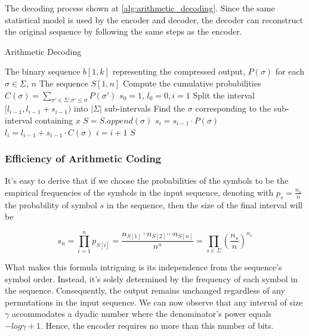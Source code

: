 \noindent The decoding process shown at \ref{alg:arithmetic_decoding}. Since the same statistical model is used by the encoder and decoder, the decoder can reconstruct the original sequence by following the same steps as the encoder.

\begin{algorithm}
    \caption{Arithmetic Decoding} \label{alg:arithmetic_decoding}
    \begin{algorithmic}
        \Require The binary sequence $b[1,k]$ representing the compressed output, $P(\sigma)$ for each $\sigma \in \Sigma$, $n$
        \Ensure The sequence $S[1,n]$
        \State Compute the cumulative probabilities $C(\sigma) = \sum_{\sigma' \in \Sigma: \sigma' \leq \sigma} P(\sigma')$
        \State $s_0 = 1$, $l_0 = 0, i = 1$
        \State Split the interval $[l_{i-1}, l_{i-1} + s_{i-1})$ into $|\Sigma|$ sub-intervals
        \State Find the $\sigma$ corresponding to the sub-interval containing $x$
        \State $S = S.append(\sigma)$
        \State $s_i = s_{i-1} \cdot P(\sigma)$
        \State $l_i = l_{i-1} + s_{i-1} \cdot C(\sigma)$
        \State $i = i + 1$
        \EndWhile
        \State \Return $S$
    \end{algorithmic}
\end{algorithm}

\subsubsection*{Efficiency of Arithmetic Coding}

It's easy to derive that if we choose the probabilities of the symbols to be the empirical frequencies of the symbols in the input sequence, denoting with $p_s = \frac{n_s}{n}$ the probability of symbol $s$ in the sequence, then the size of the final interval will be

\begin{equation}
    s_n = \prod_{i=1}^n p_{S[i]}  = \frac{n_{S[1]} \cdot n_{S[2]} \cdots n_{S[n]}}{n^n} = \prod_{s \in \Sigma} \left (\frac{n_s}{n} \right)^{n_s}
\end{equation}

\noindent What makes this formula intriguing is its independence from the sequence's symbol order. Instead, it's solely determined by the frequency of each symbol in the sequence. Consequently, the output remains unchanged regardless of any permutations in the input sequence. We can now observe that any interval of size $\gamma$ accommodates a dyadic number where the denominator's power equals $-log \gamma + 1$. Hence, the encoder requires no more than this number of bits.

